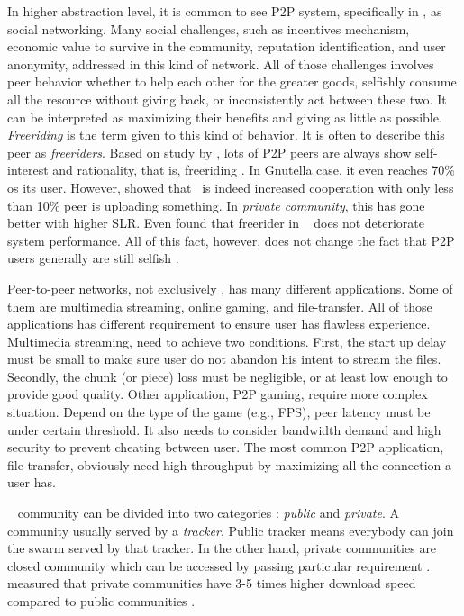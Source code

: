 In higher abstraction level, it is common to see P2P system, specifically in \bt, as social networking. Many social challenges, such as incentives mechanism, economic value to survive in the community, reputation identification, and user anonymity, addressed in this kind of network. All of those challenges involves peer behavior whether to help each other for the greater goods, selfishly consume all the resource without giving back, or inconsistently act between these two. It can be interpreted as maximizing their benefits and giving as little as possible. \textit{Freeriding} is the term given to this kind of behavior. It is often to describe this peer as \textit{freeriders}. Based on study by \citeauthor{2000:freeridegnutella:adar}, lots of P2P peers are always show self-interest and rationality, that is, freeriding \cite{2000:freeridegnutella:adar}. In Gnutella case, it even reaches 70\% os its user.  However, \citeauthor{2005:bittorrentcooperation:andrade} showed that \bt~is indeed increased cooperation with only less than 10\% peer is uploading something. In \textit{private community}, this has gone better with higher SLR. Even \citeauthor{2015:freeriderinbtcommunity:das} found that freerider in \bt~ does not deteriorate system performance\cite{2015:freeriderinbtcommunity:das}. All of this fact, however, does not change the fact that P2P users generally are still selfish \cite{2014:userbehaviourprivate:jia}. 

Peer-to-peer networks, not exclusively \bt, has many different applications. Some of them are multimedia streaming, online gaming, and file-transfer. All of those applications has different requirement to ensure user has flawless experience. Multimedia streaming, need 
to achieve two conditions. First, the start up delay must be small to make sure user do not abandon his intent to stream the files. Secondly, the chunk (or piece) loss must be negligible, or at least low enough to provide good quality\cite{2008:givetogetvod:Mol}. Other application, P2P gaming, require more complex situation. Depend on the type of the game (e.g., FPS), peer latency must be under certain threshold\cite{2010:surveyp2pgame:shen}. It also needs to consider bandwidth demand and high security to prevent cheating between user. The most common P2P application, file transfer, obviously need high throughput by maximizing all the connection a user has.

\bt~ community can be divided into two categories : \textit{public} and \textit{private}. A community usually served by a \textit{tracker}. Public tracker means everybody can join the swarm served by that tracker. In the other hand, private communities are closed community which can be accessed by passing particular requirement \cite{2010:pubpriv:meulpolder, 2014:sustainabilitytorrent:chen}. \citeauthor{2010:pubpriv:meulpolder} measured that private communities have 3-5 times higher download speed compared to public communities \cite{2010:pubpriv:meulpolder}.

